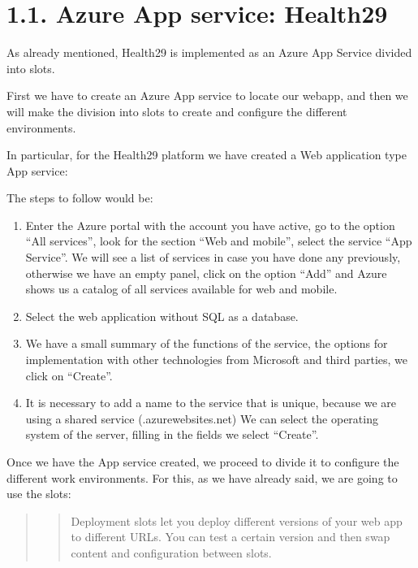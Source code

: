 \documentclass[letterpaper,10pt,english]{sphinxmanual}
\begin{document}
\chapter{1.1. Azure App service: Health29}
\label{\detokenize{pages/Environments/Azure_App_Services:azure-app-service-health29}}\label{\detokenize{pages/Environments/Azure_App_Services::doc}}
As already mentioned, Health29 is implemented as an Azure App Service divided into slots.

First we have to create an Azure App service to locate our webapp, and then we will make the division into slots to create and configure the different environments.

In particular, for the Health29 platform we have created a Web application type App service: 

The steps to follow would be:
\begin{enumerate}
%
\item {} 
Enter the Azure portal with the account you have active, go to the option “All services”, look for the section “Web and mobile”, select the service “App Service”.
We will see a list of services in case you have done any previously, otherwise we have an empty panel, click on the option “Add” and Azure shows us a catalog of all services available for web and mobile.

\item {} 
Select the web application without SQL as a database.

\item {} 
We have a small summary of the functions of the service, the options for implementation with other technologies from Microsoft and third parties, we click on “Create”.

\item {} 
It is necessary to add a name to the service that is unique, because we are using a shared service (.azurewebsites.net) We can select the operating system of the server, filling in the fields we select “Create”.

\end{enumerate}

Once we have the App service created, we proceed to divide it to configure the different work environments. For this, as we have already said, we are going to use the slots:
\begin{quote}
\begin{quote}

Deployment slots let you deploy different versions of your web app to different URLs. You can test a certain version and then swap content and configuration between slots.
\end{quote}
\end{quote}
\end{document}
